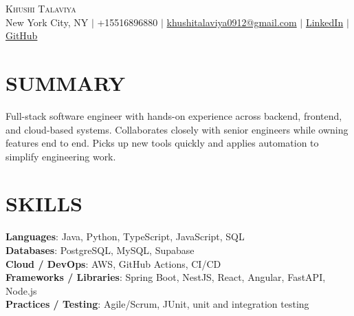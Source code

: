 \documentclass[letterpaper,11pt]{article}
\begin{document}
\begin{center}
    {\Huge \scshape Khushi Talaviya} \\ \vspace{2pt}
    \vspace{4pt}
    \small
    New York City, NY $|$
    \small
    +15516896880 $|$
    \href{mailto:khushitalaviya0912@gmail.com}{khushitalaviya0912@gmail.com} $|$
    \href{https://www.linkedin.com/in/khushitalaviya/}{LinkedIn} $|$
    \href{https://github.com/talaviyakhushi}{GitHub}
\end{center}

\section{SUMMARY}
\vspace{5pt}
\small{Full-stack software engineer with hands-on experience across backend, frontend, and cloud-based systems. Collaborates closely with senior engineers while owning features end to end. Picks up new tools quickly and applies automation to simplify engineering work.}

\vspace{2pt}
\section{SKILLS}
\vspace{5pt}
\begin{itemize}[leftmargin=0in, label={}]
\small{\item{
\textbf{Languages}{: Java, Python, TypeScript, JavaScript, SQL} \\
\textbf{Databases}{: PostgreSQL, MySQL, Supabase} \\
\textbf{Cloud / DevOps}{: AWS, GitHub Actions, CI/CD} \\
\textbf{Frameworks / Libraries}{: Spring Boot, NestJS, React, Angular, FastAPI, Node.js} \\
\textbf{Practices / Testing}{: Agile/Scrum, JUnit, unit and integration testing}
}}
\end{itemize}
\vspace{-10pt}

\end{document}
